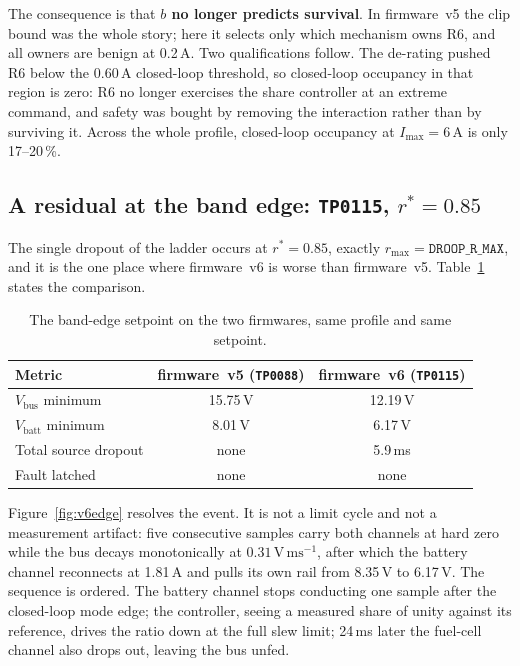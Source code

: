 \documentclass[11pt]{article}
\newcommand{\code}[1]{\texttt{#1}}
\begin{document}
The consequence is that \textbf{$b$ no longer predicts survival}. In firmware~v5
the clip bound was the whole story; here it selects only which mechanism owns
R6, and all owners are benign at 0.2\,A. Two qualifications follow. The de-rating
pushed R6 below the 0.60\,A closed-loop threshold, so closed-loop occupancy in
that region is zero: R6 no longer exercises the share controller at an extreme
command, and safety was bought by removing the interaction rather than by
surviving it. Across the whole profile, closed-loop occupancy at
$I_\mathrm{max}=6$\,A is only 17--20\,\%.

\subsection{A residual at the band edge: \code{TP0115}, $r^\ast=0.85$}
\label{sec:v6edge}

The single dropout of the ladder occurs at $r^\ast=0.85$, exactly
$r_{\max}=\code{DROOP\_R\_MAX}$, and it is the one place where firmware~v6 is
worse than firmware~v5. Table~\ref{tab:v6edge} states the comparison.

\begin{table}[H]
\centering
\caption{The band-edge setpoint on the two firmwares, same profile and same
setpoint.}
\label{tab:v6edge}
\begin{tabular}{lcc}
\toprule
Metric & firmware~v5 (\code{TP0088}) & firmware~v6 (\code{TP0115}) \\
\midrule
$V_\mathrm{bus}$ minimum & 15.75\,V & 12.19\,V \\
$V_\mathrm{batt}$ minimum & 8.01\,V & 6.17\,V \\
Total source dropout & none & 5.9\,ms \\
Fault latched & none & none \\
\bottomrule
\end{tabular}
\end{table}

Figure~\ref{fig:v6edge} resolves the event. It is not a limit cycle and not a
measurement artifact: five consecutive samples carry both channels at hard zero
while the bus decays monotonically at $0.31\,\mathrm{V\,ms^{-1}}$, after which
the battery channel reconnects at 1.81\,A and pulls its own rail from 8.35\,V to
6.17\,V. The sequence is ordered. The battery channel stops conducting one
sample after the closed-loop mode edge; the controller, seeing a measured share
of unity against its reference, drives the ratio down at the full slew limit;
24\,ms later the fuel-cell channel also drops out, leaving the bus unfed.
\end{document}
